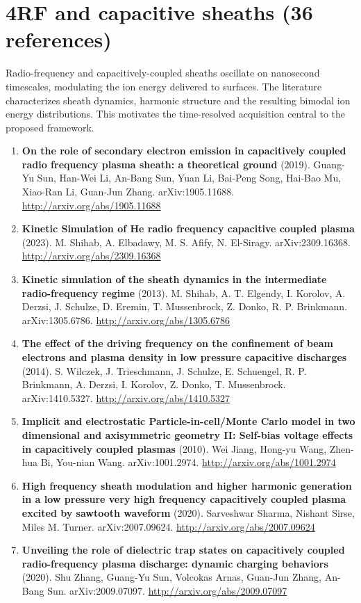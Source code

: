 \documentclass[11pt,a4paper]{article}
\begin{document}
\section*{4\quad RF and capacitive sheaths \textnormal{(\normalsize 36 references)}}
Radio-frequency and capacitively-coupled sheaths oscillate on nanosecond timescales, modulating the ion energy delivered to surfaces. The literature characterizes sheath dynamics, harmonic structure and the resulting bimodal ion energy distributions. This motivates the time-resolved acquisition central to the proposed framework.
\begin{enumerate}[leftmargin=1.4em]
\item \textbf{On the role of secondary electron emission in capacitively coupled radio frequency plasma sheath: a theoretical ground} (2019). Guang-Yu Sun, Han-Wei Li, An-Bang Sun, Yuan Li, Bai-Peng Song, Hai-Bao Mu, Xiao-Ran Li, Guan-Jun Zhang. arXiv:1905.11688. \url{http://arxiv.org/abs/1905.11688}
\item \textbf{Kinetic Simulation of He radio frequency capacitive coupled plasma} (2023). M. Shihab, A. Elbadawy, M. S. Afify, N. El-Siragy. arXiv:2309.16368. \url{http://arxiv.org/abs/2309.16368}
\item \textbf{Kinetic simulation of the sheath dynamics in the intermediate radio-frequency regime} (2013). M. Shihab, A. T. Elgendy, I. Korolov, A. Derzsi, J. Schulze, D. Eremin, T. Mussenbrock, Z. Donko, R. P. Brinkmann. arXiv:1305.6786. \url{http://arxiv.org/abs/1305.6786}
\item \textbf{The effect of the driving frequency on the confinement of beam electrons and plasma density in low pressure capacitive discharges} (2014). S. Wilczek, J. Trieschmann, J. Schulze, E. Schuengel, R. P. Brinkmann, A. Derzsi, I. Korolov, Z. Donko, T. Mussenbrock. arXiv:1410.5327. \url{http://arxiv.org/abs/1410.5327}
\item \textbf{Implicit and electrostatic Particle-in-cell/Monte Carlo model in two dimensional and axisymmetric geometry II: Self-bias voltage effects in capacitively coupled plasmas} (2010). Wei Jiang, Hong-yu Wang, Zhen-hua Bi, You-nian Wang. arXiv:1001.2974. \url{http://arxiv.org/abs/1001.2974}
\item \textbf{High frequency sheath modulation and higher harmonic generation in a low pressure very high frequency capacitively coupled plasma excited by sawtooth waveform} (2020). Sarveshwar Sharma, Nishant Sirse, Miles M. Turner. arXiv:2007.09624. \url{http://arxiv.org/abs/2007.09624}
\item \textbf{Unveiling the role of dielectric trap states on capacitively coupled radio-frequency plasma discharge: dynamic charging behaviors} (2020). Shu Zhang, Guang-Yu Sun, Volcokas Arnas, Guan-Jun Zhang, An-Bang Sun. arXiv:2009.07097. \url{http://arxiv.org/abs/2009.07097}

\end{enumerate}
\end{document}
